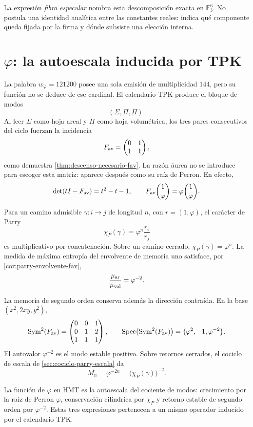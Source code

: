 \def\HMTAxialTheoremDefined{1}

La expresión \emph{fibra especular} nombra esta descomposición exacta en
\(\mathbb F_3^6\). No postula una identidad analítica entre las constantes
reales: indica qué componente queda fijada por la firma y dónde subsiste una
elección interna.

\section{\texorpdfstring{\(\varphi\)}{Phi}: la autoescala inducida por TPK}

La palabra \(w_\varphi=121200\) posee una sola emisión de multiplicidad
\(144\), pero su función no se deduce de ese cardinal. El calendario TPK
produce el bloque de modos
\[
(\Sigma,\Pi,\Pi).
\]
Al leer \(\Sigma\) como hoja areal y \(\Pi\) como hoja volumétrica, los
tres pares consecutivos del ciclo fuerzan la incidencia
\[
F_{\rm av}
=
\begin{pmatrix}
0&1\\
1&1
\end{pmatrix},
\]
como demuestra \cref{thm:descenso-necesario-fav}. La razón áurea no se
introduce para escoger esta matriz: aparece después como su raíz de Perron.
En efecto,
\[
\det(tI-F_{\rm av})=t^2-t-1,
\qquad
F_{\rm av}\binom{1}{\varphi}
=\varphi\binom{1}{\varphi}.
\]

Para un camino admisible \(\gamma:i\to j\) de longitud \(n\), con
\(r=(1,\varphi)\), el carácter de Parry
\[
\chi_P(\gamma)=\varphi^n\frac{r_i}{r_j}
\]
es multiplicativo por concatenación. Sobre un camino cerrado,
\(\chi_P(\gamma)=\varphi^n\). La medida de máxima entropía del envolvente
de memoria uno satisface, por \cref{cor:parry-envolvente-fav},
\[
\frac{\mu_{\rm ar}}{\mu_{\rm vol}}=\varphi^{-2}.
\]

La memoria de segundo orden conserva además la dirección contraída. En la
base \((x^2,2xy,y^2)\),
\[
\operatorname{Sym}^2(F_{\rm av})
=
\begin{pmatrix}
0&0&1\\
0&1&2\\
1&1&1
\end{pmatrix},
\qquad
\operatorname{Spec}\bigl(\operatorname{Sym}^2(F_{\rm av})\bigr)
=\{\varphi^2,-1,\varphi^{-2}\}.
\]
El autovalor \(\varphi^{-2}\) es el modo estable positivo. Sobre retornos
cerrados, el cociclo de escala de \cref{sec:cociclo-parry-escala} da
\[
M_n=\varphi^{-2n}={\bigl(\chi_P(\gamma)\bigr)}^{-2}.
\]

\begin{proposition}
\label{prop:autoescala-phi-rev6}
La función de \(\varphi\) en HMT es la autoescala del cociente de modos:
crecimiento por la raíz de Perron \(\varphi\), conservación cilíndrica por
\(\chi_P\) y retorno estable de segundo orden por \(\varphi^{-2}\).
Estas tres expresiones pertenecen a un mismo operador inducido por el
calendario TPK.
\end{proposition}

